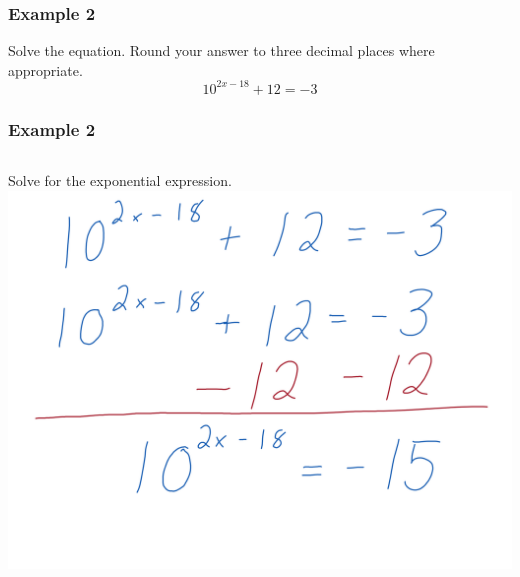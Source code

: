 \documentclass[aspectratio=169,17pt]{beamer}
\begin{document}
\begin{frame}[t]
	\frametitle{Example 2}
	Solve the equation. Round your answer to three decimal places where appropriate.
	$$10^{2x-18} + 12 = -3$$
\end{frame}

\begin{frame}
	\frametitle{Example 2}
	\begin{columns}
			Solve for the exponential expression.
			\includegraphics[width=\textwidth]{logarithmic_equations-work_04.png}
	\end{columns}
\end{frame}
\end{document}

